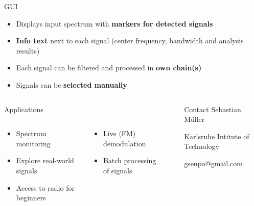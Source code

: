 \documentclass{beamer}
\begin{document}
\begin{frame}
\begin{columns}[t]
\begin{column}{0.68\textwidth}
\begin{block}{GUI}
\begin{figure}
      \end{figure}
      \begin{itemize}
        \item Displays input spectrum with \textbf{markers for detected signals}
        \item \textbf{Info text} next to each signal (center frequency, bandwidth and analysis results)
        \item Each signal can be filtered and processed in \textbf{own chain(s)}
        \item Signals can be \textbf{selected manually}
      \end{itemize}
      \end{block}
    \end{column}
  \end{columns}
  \begin{columns}[t]
  	\begin{column}{0.68\textwidth}
  		\begin{block}{Applications}
  			\begin{columns}
        \begin{column}{0.45\textwidth}
        \begin{itemize}
          \item Spectrum monitoring
          \item Explore real-world signals
          \item Access to radio for beginners
        \end{itemize}
        \end{column}
        \begin{column}{0.45\textwidth}
         \begin{itemize}
          \item Live (FM) demodulation
          \item Batch processing of signals
        \end{itemize}
        \end{column}
        \end{columns}
  		\end{block}
  	\end{column}
  	\begin{column}{0.007\textwidth}
  	\end{column}
  	\begin{column}{0.33\textwidth}
  		\begin{block}{Contact}
  			Sebastian Müller

  			Karlsruhe Intitute of Technology

  			gsenpo@gmail.com
  			\vspace{0.3em}
  		\end{block}
  	\end{column}
  \end{columns}
\end{frame}
\end{document}
